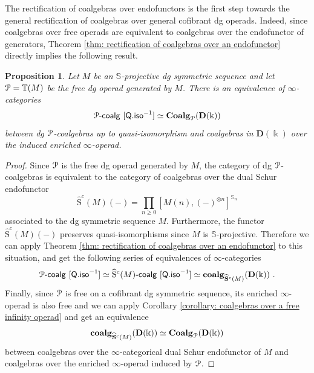 \documentclass{proc-l}
\renewcommand{\mathcal}{\EuScript}
\theoremstyle{plain}
\newtheorem{proposition}[{theorem}]{Proposition}
\theoremstyle{definition}
\theoremstyle{remark}
\newcommand{\kk}{\Bbbk}
\begin{document}
The rectification of coalgebras over endofunctors is the first step towards the general rectification of coalgebras over general cofibrant dg operads. Indeed, since coalgebras over free operads are equivalent to coalgebras over the endofunctor of generators, Theorem \ref{thm: rectification of coalgebras over an endofunctor} directly implies the following result.

\begin{proposition}%
\label{Proposition:4.10}\label{prop: rectification of coalgebras over free operads}
Let $M$ be an $\mathbb{S}$-projective dg symmetric sequence and let $\mathcal{P} = \mathbb{T}(M)$ be the free dg operad generated by $M$. There is an equivalence of $\infty$-categories
\[
\mathcal{P}\text{-}\mathsf{coalg}~[\mathsf{Q.iso}^{-1}] \simeq \mathbf{Coalg}_{\mathcal{P}}(\mathbf{D}(\kk))
\]
between dg $\mathcal{P}$-coalgebras up to quasi-isomorphism and coalgebras in $\mathbf{D}(\kk)$ over the induced enriched $\infty$-operad.
\end{proposition}

\begin{proof}
Since $\mathcal{P}$ is the free dg operad generated by $M$, the category of dg $\mathcal{P}$-coalgebras is equivalent to the category of coalgebras over the dual Schur endofunctor
\[
\widehat{\mathrm{S}}^c(M)(-) = \prod_{n\geq 0} [M(n),(-)^{\otimes n}]^{\mathbb{S}_n}
\]
associated to the dg symmetric sequence $M$. Furthermore, the functor $\widehat{\mathrm{S}}^c(M)(-)$ preserves quasi-isomorphisms since $M$ is $\mathbb{S}$-projective. Therefore we can apply Theorem \ref{thm: rectification of coalgebras over an endofunctor} to this situation, and get the following series of equivalences of $\infty$-categories
\[
\mathcal{P}\text{-}\mathsf{coalg}~[\mathsf{Q.iso}^{-1}] \simeq \widehat{\mathrm{S}}^c(M)\text{-}\mathsf{coalg}~[\mathsf{Q.iso}^{-1}] \simeq \mathbf{coalg}_{\widehat{\mathbf{S}}^c(M)}(\mathbf{D}(\kk))~.
\]
Finally, since $\mathcal{P}$ is free on a cofibrant dg symmetric sequence, its enriched $\infty$-operad is also free and we can apply Corollary \ref{corollary: coalgebras over a free infinity operad} and get an equivalence
\[
\mathbf{coalg}_{\widehat{\mathbf{S}}^c(M)}(\mathbf{D}(\kk)) \simeq \mathbf{Coalg}_{\mathcal{P}}(\mathbf{D}(\kk))
\]
between coalgebras over the $\infty$-categorical dual Schur endofunctor of $M$ and coalgebras over the enriched $\infty$-operad induced by $\mathcal{P}$.
\end{proof}
\end{document}
